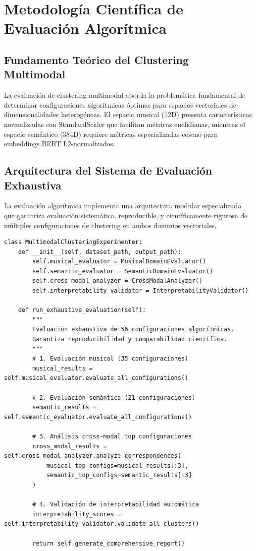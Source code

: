 \documentclass[12pt,a4paper]{report}
\begin{document}
\section{Metodología Científica de Evaluación Algorítmica}

\subsection{Fundamento Teórico del Clustering Multimodal}

La evaluación de clustering multimodal aborda la problemática fundamental de determinar configuraciones algorítmicas óptimas para espacios vectoriales de dimensionalidades heterogéneas. El espacio musical (12D) presenta características normalizadas con StandardScaler que facilitan métricas euclidianas, mientras el espacio semántico (384D) requiere métricas especializadas coseno para embeddings BERT L2-normalizados.

\subsection{Arquitectura del Sistema de Evaluación Exhaustiva}

La evaluación algorítmica implementa una arquitectura modular especializada que garantiza evaluación sistemática, reproducible, y científicamente rigurosa de múltiples configuraciones de clustering en ambos dominios vectoriales.

\begin{lstlisting}[caption={Arquitectura del Sistema de Evaluación Multimodal}]
class MultimodalClusteringExperimenter:
    def __init__(self, dataset_path, output_path):
        self.musical_evaluator = MusicalDomainEvaluator()
        self.semantic_evaluator = SemanticDomainEvaluator()
        self.cross_modal_analyzer = CrossModalAnalyzer()
        self.interpretability_validator = InterpretabilityValidator()

    def run_exhaustive_evaluation(self):
        """
        Evaluación exhaustiva de 56 configuraciones algorítmicas.
        Garantiza reproducibilidad y comparabilidad científica.
        """
        # 1. Evaluación musical (35 configuraciones)
        musical_results = self.musical_evaluator.evaluate_all_configurations()

        # 2. Evaluación semántica (21 configuraciones)
        semantic_results = self.semantic_evaluator.evaluate_all_configurations()

        # 3. Análisis cross-modal top configuraciones
        cross_modal_results = self.cross_modal_analyzer.analyze_correspondences(
            musical_top_configs=musical_results[:3],
            semantic_top_configs=semantic_results[:3]
        )

        # 4. Validación de interpretabilidad automática
        interpretability_scores = self.interpretability_validator.validate_all_clusters()

        return self.generate_comprehensive_report()
\end{lstlisting}
\end{document}
